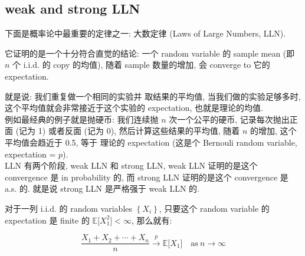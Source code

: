 \subsection{weak and strong LLN}\label{weak-and-strong-lln}

下面是概率论中最重要的定律之一: 大数定律 (Laws of Large Numbers, LLN).

它证明的是一个十分符合直觉的结论: 一个 random variable 的 sample mean (即 \(\mathit{n}\) 个 i.i.d. 的 copy 的均值), 随着 sample 数量的增加, 会 converge to 它的 expectation.

就是说: 我们重复做一个相同的实验并 取结果的平均值, 当我们做的实验足够多时, 这个平均值就会非常接近于这个实验的 expectation, 也就是理论的均值.\\
例如最经典的例子就是抛硬币: 我们连续抛 \(\mathit{n}\) 次一个公平的硬币, 记录每次抛出正面 (记为 1) 或者反面 (记为 0), 然后计算这些结果的平均值, 随着 \(\mathit{n}\) 的增加, 这个平均值会趋近于 0.5, 等于 理论的 expectation (这是个 Bernouli random variable, expectation = \(\mathit{p}\)).\\
LLN 有两个阶段, weak LLN 和 strong LLN, weak LLN 证明的是这个 convergence 是 in probability 的, 而 strong LLN 证明的是这个 convergence 是 a.s. 的. 就是说 strong LLN 是严格强于 weak LLN 的.

\begin{theorem}{}\label{thm-04-lln-weak-law-of-large-numbers}

对于一列 i.i.d. 的 random variables \(\left\{ \mathit{X}_{\mathit{i}} \right\}\), 只要这个 random variable 的 expectation 是 finite 的 \(\mathbb{E}\lbrack\mathit{X}_{1}^{2}\rbrack < \infty\), 那么就有:

\[\frac{\mathit{X}_{1} + \mathit{X}_{2} + \cdots + \mathit{X}_{\mathit{n}}}{\mathit{n}}\overset{\mathit{p}}{\rightarrow}\mathbb{E}\lbrack\mathit{X}_{1}\rbrack\quad\text{as}\ \mathit{n}\rightarrow\infty\]

\end{theorem}


